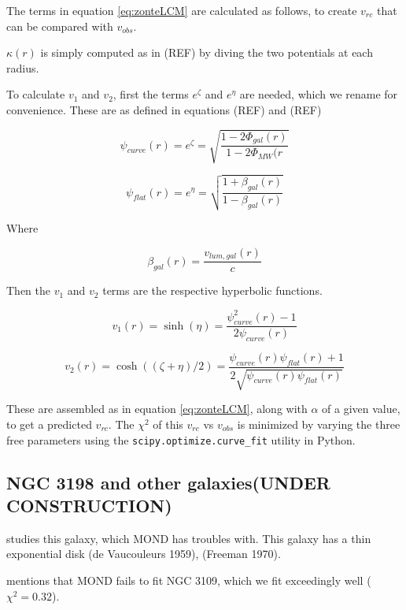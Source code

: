 \documentclass[reprint,%
 amsmath,amssymb,
 aps,
]{revtex4-1}
\begin{document}
The terms in equation \ref{eq:zonteLCM} are calculated as follows, to create $v_{rc}$ that can be compared with $v_{obs}$. 

$\kappa(r)$ is simply computed as in (REF) by diving the two potentials at each radius.

To calculate $v_1$ and $v_2$, first the terms $e^\zeta$ and $e^\eta$ are needed, which we rename for convenience. These are as defined in equations (REF) and (REF)

\begin{equation}
    \psi_{curve}(r) = e^\zeta = \sqrt{\frac{1 - 2\Phi_{gal}(r)}{1 - 2\Phi_{MW}(r}}
\end{equation}

\begin{equation}
    \psi_{flat}(r) = e^\eta = \sqrt{\frac{1 + \beta_{gal}(r)}{1 - \beta_{gal}(r)}}
\end{equation}

Where

\begin{equation}
    \beta_{gal}(r) = \frac{v_{lum,gal}(r)}{c}
\end{equation}

Then the $v_1$ and $v_2$ terms are the respective hyperbolic functions.

\begin{equation}
    v_1(r) = \sinh(\eta) = \frac{\psi_{curve}^2(r) - 1}{2 \psi_{curve}(r)}
\end{equation}

\begin{equation}
    v_2(r) = \cosh((\zeta + \eta)/2) = \frac{\psi_{curve}(r) \psi_{flat}(r) + 1}{
    2\sqrt{\psi_{curve}(r) \psi_{flat}(r)}}
\end{equation}

These are assembled as in equation \ref{eq:zonteLCM}, along with $\alpha$ of a given value, to get a predicted $v_{rc}$. The $\chi^2$ of this $v_{rc}$ vs $v_{obs}$ is minimized by varying the three free parameters using the {\tt scipy.optimize.curve\_fit} utility in Python.

\subsection{NGC 3198 and other galaxies(UNDER CONSTRUCTION)}
\cite{1985ApJAlbada} studies this galaxy, which MOND has troubles with. This galaxy has   a thin exponential disk (de Vaucouleurs 1959),
(Freeman 1970).  
 
\cite{Toky} mentions that MOND fails to fit NGC 3109, which we fit exceedingly well ($\chi^2 = 0.32$).
\end{document}
